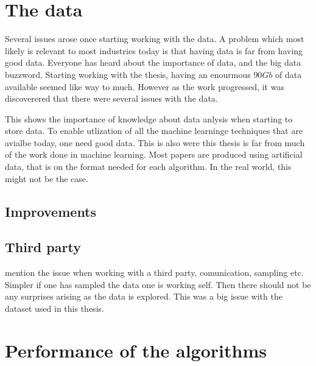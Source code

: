 \section{The data}
    Several issues arose once starting working with the data. A problem which most likely is relevant to most industries today is that having data is far from having good data. Everyone has heard about the importance of data, and the big data buzzword. Starting working with the thesis, having an enourmous $90Gb$ of data available seemed like way to much. However as the work progressed, it was discoverered that there were several issues with the data. 
    
    This shows the importance of knowledge about data anlysis when starting to store data. To enable utlization of all the machine learninge techniques that are avialbe today, one need good data. This is also were this thesis is far from much of the work done in machine learning. Most papers are produced using artificial data, that is on the format needed for each algorithm. In the real world, this might not be the case. 
    
    \subsection{Improvements}
    
    \subsection{Third party}
        mention the issue when working with a third party, comunication, sampling etc. Simpler if one has sampled the data one is working self. Then there should not be any surprises arising as the data is explored. This was a big issue with the dataset used in this thesis. 
\section{Performance of the algorithms}


